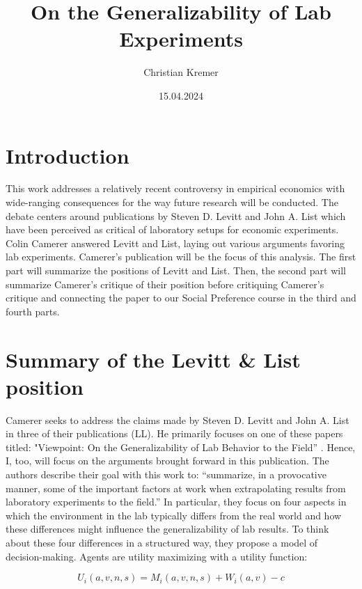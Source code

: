 \documentclass{article}
\title{On the Generalizability of Lab Experiments}
\author{Christian Kremer}
\date{15.04.2024}
\begin{document}
\maketitle

\section*{Introduction}

This work addresses a relatively recent controversy in empirical economics with wide-ranging consequences for the way future research will be conducted. The debate centers around publications by Steven D. Levitt and John A. List which have been perceived as critical of laboratory setups for economic experiments. Colin Camerer answered Levitt and List, laying out various arguments favoring lab experiments. Camerer’s publication will be the focus of this analysis. The first part will summarize the positions of Levitt and List. Then, the second part will summarize Camerer's critique of their position before critiquing Camerer's critique and connecting the paper to our Social Preference course in the third and fourth parts. 

\section*{Summary of the Levitt \& List position}


Camerer seeks to address the claims made by Steven D. Levitt and John A. List in three of their publications \citep{Levitt.2007,Levitt.2007b,Levitt.2008} (LL). He primarily focuses on one of these papers titled: "Viewpoint: On the Generalizability of Lab Behavior to the Field” \citep{Levitt.2007}. Hence, I, too, will focus on the arguments brought forward in this publication. The authors describe their goal with this work to: “summarize, in a provocative manner, some of the important factors at work when extrapolating results from laboratory experiments to the field.”
In particular, they focus on four aspects in which the environment in the lab typically differs from the real world and how these differences might influence the generalizability of lab results. To think about these four differences in a structured way, they propose a model of decision-making. Agents are utility maximizing with a utility function:

\begin{equation}
U_i(a, v, n, s) = M_i(a, v, n, s) + W_i(a, v) - c
\end{equation}
\end{document}
